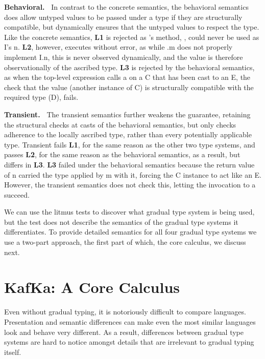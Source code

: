 \documentclass[a4paper,USenglish]{tex/lipics-v2016}
\begin{document}
{\bf Behavioral.~} In contrast to the concrete semantics, the behavioral
semantics does allow untyped values to be passed under a type if they are
structurally compatible, but dynamically ensures that the untyped values to
respect the type. Like the concrete semantics, {\bf L1} is rejected as \A's
method, \m, could never be used as \xt I's \xt n. {\bf L2}, however,
executes without error, as while \A.\xt m does not properly implement \xt
I.\xt n, this is never observed dynamically, and the value is therefore
observationally of the ascribed type. {\bf L3} is rejected by the behavioral
semantics, as when the top-level expression calls \xt a on a \xt C that has
been cast to an \xt E, the check that the value (another instance of \xt C)
is structurally compatible with the required type (\xt D), fails.

{\bf Transient.~} The transient semantics further weakens the guarantee,
retaining the structural checks at casts of the behavioral semantics, but
only checks adherence to the locally ascribed type, rather than every
potentially applicable type. Transient fails {\bf L1}, for the same reason
as the other two type systems, and passes {\bf L2}, for the same reason as
the behavioral semantics, as a result, but differs in {\bf L3}. {\bf L3}
failed under the behavioral semantics because the return value of \xt n
carried the type applied by \xt m with it, forcing the \xt C instance to act
like an \xt E.  However, the transient semantics does not check this,
letting the invocation to \xt a succeed.

We can use the litmus tests to discover what gradual type system is being
used, but the test does not describe the semantics of the gradual type
systems it differentiates. To provide detailed semantics for all four
gradual type systems we use a two-part approach, the first part of which,
the \kafka core calculus, we discuss next.


\section{KafKa: A Core Calculus}\label{kafkacore}

\noindent Even without gradual typing, it is notoriously difficult to compare
languages. Presentation and semantic differences can make even the most similar
languages look and behave very different. As a result, differences between gradual type
systems are hard to notice amongst details that are irrelevant to gradual typing itself.
\end{document}
